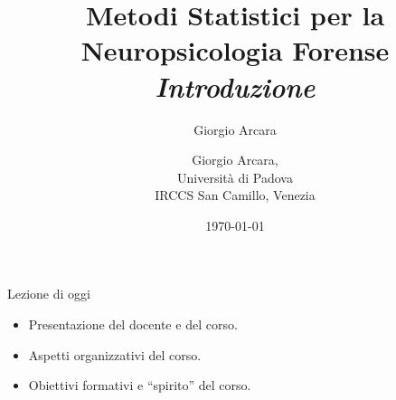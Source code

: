 \documentclass[
  ignorenonframetext,
]{beamer}
\author{Giorgio Arcara}
\date{}
\providecommand{\tightlist}{%
  \setlength{\itemsep}{0pt}\setlength{\parskip}{0pt}}
\begin{document}
\begin{frame}
\title{Metodi Statistici per la Neuropsicologia Forense\\ \vspace{1em} \emph{Introduzione}}
\author{Giorgio Arcara,\\ Università di Padova \\ IRCCS San Camillo, Venezia}

\date{\today}
\maketitle
\end{frame}

\begin{frame}{Lezione di oggi}
\label{lezione-di-oggi}
\begin{itemize}
\tightlist
\item
  Presentazione del docente e del corso.
\item
  Aspetti organizzativi del corso.
\item
  Obiettivi formativi e ``spirito'' del corso.
\end{itemize}
\end{frame}
\end{document}
